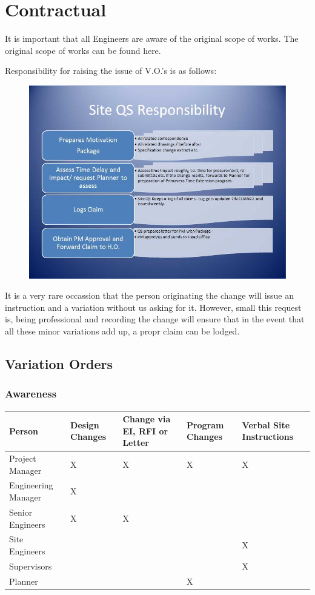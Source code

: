 \chapter{Contractual}

It is important that all Engineers are aware of the original scope of works. The original scope of works can be found here.

Responsibility for raising the issue of V.O.'s is as follows:

\begin{figure}
\includegraphics[width=1.3\textwidth]{./graphics/Site-QS-responsibilities}
\end{figure}


It is a very rare occassion that the person originating the change will
issue an instruction and a variation without us asking for it. However,
small this request is, being professional and recording the change will
ensure that in the event that all these minor variations add up, a propr claim
can be lodged.

\section*{Variation Orders}

\subsection*{Awareness}

\begin{tabular}{|l|l|p{2.0cm}|p{2.0cm}|p{2.0cm}|}
\hline
Person &Design Changes&Change via EI, RFI or Letter&Program Changes&Verbal Site Instructions\\\hline
Project Manager    &X&X&X&X\\\hline
Engineering Manager&X& & & \\\hline
Senior Engineers   &X&X& & \\\hline  
Site Engineers     & & & &X\\\hline
Supervisors        & & & &X\\\hline
Planner            & & &X& \\\hline
\end{tabular}  

